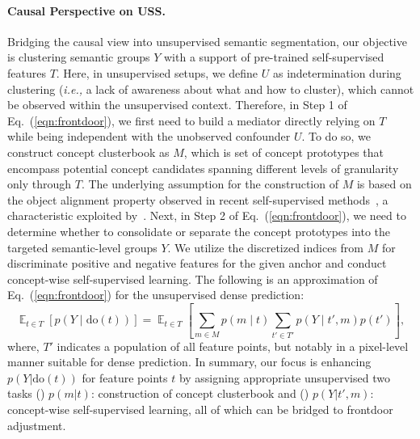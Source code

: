 \documentclass{article} \usepackage{iclr2024_conference,times}
\begin{document}
\paragraph{Causal Perspective on USS.} Bridging the causal view into unsupervised semantic segmentation, our objective is clustering semantic groups $Y$ with a support of pre-trained self-supervised features $T$. Here, in unsupervised setups, we define $U$ as indetermination during clustering (\textit{i.e.,} a lack of awareness about what and how to cluster), which cannot be observed within the unsupervised context. Therefore, in Step 1 of Eq.~(\ref{eqn:frontdoor}), we first need to build a mediator directly relying on $T$ while being independent with the unobserved confounder $U$. To do so, we construct concept clusterbook as $M$, which is set of concept prototypes that encompass potential concept candidates spanning different levels of granularity only through $T$. The underlying assumption for the construction of $M$ is based on the object alignment property observed in recent self-supervised methods~\citep{caron2021emerging, oquab2023dinov2}, a characteristic exploited by~\citet{hamilton2022unsupervised, seong2023leveraging}. Next, in Step 2 of Eq.~(\ref{eqn:frontdoor}), we need to determine whether to consolidate or separate the concept prototypes into the targeted semantic-level groups $Y$. We utilize the discretized indices from $M$ for discriminate positive and negative features for the given anchor and conduct concept-wise self-supervised learning. The following is an approximation of Eq.~(\ref{eqn:frontdoor}) for the unsupervised dense prediction:
\begin{equation}
\label{eqn:frontdoor2}
    \mathop{\mathbb{E}}_{t\in T}\left[p(Y\mid \text{do}(t) )\right]=\mathop{\mathbb{E}}_{t\in T}\left[\sum_{m\in M}p(m \mid t)\sum_{t'\in T'}{p(Y\mid t', m)}p(t')\right],
\end{equation}
where, $T'$ indicates a population of all feature points, but notably in a pixel-level manner suitable for dense prediction. In summary, our focus is enhancing $p(Y|\text{do}(t))$ for feature points $t$ by assigning appropriate unsupervised two tasks (\lowercase\expandafter{}) $p(m|t)$: construction of concept clusterbook and (\lowercase\expandafter{}) $p(Y|t', m)$: concept-wise self-supervised learning, all of which can be bridged to frontdoor adjustment.
\end{document}
